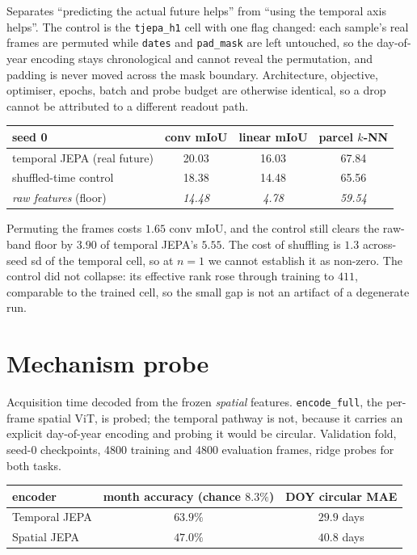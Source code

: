 \documentclass{article}
\begin{document}
Separates ``predicting the actual future helps'' from ``using the temporal axis helps''. The control
is the \texttt{tjepa\_h1} cell with one flag changed: each sample's real frames are permuted while
\texttt{dates} and \texttt{pad\_mask} are left untouched, so the day-of-year encoding stays
chronological and cannot reveal the permutation, and padding is never moved across the mask boundary.
Architecture, objective, optimiser, epochs, batch and probe budget are otherwise identical, so a drop
cannot be attributed to a different readout path.

\begin{center}
\footnotesize
\begin{tabular}{lccc}
\toprule
seed 0 & conv mIoU & linear mIoU & parcel $k$-NN \\
\midrule
temporal JEPA (real future) & 20.03 & 16.03 & 67.84 \\
shuffled-time control       & 18.38 & 14.48 & 65.56 \\
\emph{raw features} (floor) & \emph{14.48} & \emph{4.78} & \emph{59.54} \\
\bottomrule
\end{tabular}
\end{center}

Permuting the frames costs $1.65$ conv mIoU, and the control still clears the raw-band floor by
$3.90$ of temporal JEPA's $5.55$. The cost of shuffling is $1.3$ across-seed sd of the temporal cell,
so at $n{=}1$ we cannot establish it as non-zero. The control did not collapse: its effective rank
rose through training to $411$, comparable to the trained cell, so the small gap is not an artifact
of a degenerate run.

\section{Mechanism probe}
\label{app:mech}

Acquisition time decoded from the frozen \emph{spatial} features. \texttt{encode\_full}, the
per-frame spatial ViT, is probed; the temporal pathway is not, because it carries an explicit
day-of-year encoding and probing it would be circular. Validation fold, seed-0 checkpoints,
4800 training and 4800 evaluation frames, ridge probes for both tasks.

\begin{center}\small
\begin{tabular}{lcc}
\toprule
encoder & month accuracy (chance $8.3\%$) & DOY circular MAE \\
\midrule
Temporal JEPA & $63.9\%$ & $29.9$ days \\
Spatial JEPA  & $47.0\%$ & $40.8$ days \\
\bottomrule
\end{tabular}
\end{center}
\end{document}
